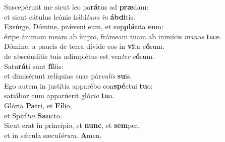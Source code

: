 \oddverse Suscepérunt me sicut leo pa\textbf{rá}tus ad \textbf{præ}dam:~\*\\
\oddverse et sicut cátulus leónis hábi\textit{tans} \textit{in} \textbf{áb}\textbf{di}tis.\\
\evenverse Exsúrge, Dómine, prǽveni eum, et sup\textbf{plán}ta \textbf{e}um:~\*\\
\evenverse éripe ánimam meam ab ímpio, frámeam tuam ab inimícis \textit{ma}\textit{nus} \textbf{tu}æ.\\
\oddverse Dómine, a paucis de terra dívide eos in \textbf{vi}ta e\textbf{ó}rum:~\*\\
\oddverse de abscónditis tuis adimplétus est ven\textit{ter} \textit{e}\textbf{ó}rum.\\
\evenverse Satu\textbf{rá}ti sunt \textbf{fí}liis:~\*\\
\evenverse et dimisérunt relíquias suas pár\textit{vu}\textit{lis} \textbf{su}is.\\
\oddverse Ego autem in justítia apparébo con\textbf{spé}ctui \textbf{tu}o:~\*\\
\oddverse satiábor cum apparúerit gló\textit{ri}\textit{a} \textbf{tu}a.\\
\evenverse Glória \textbf{Pa}tri, et \textbf{Fí}lio,~\*\\
\evenverse et Spirí\textit{tu}\textit{i} \textbf{San}cto.\\
\oddverse Sicut erat in princípio, et \textbf{nunc}, et \textbf{sem}per,~\*\\
\oddverse et in sǽcula sæcu\textit{ló}\textit{rum}. \textbf{A}men.\\
